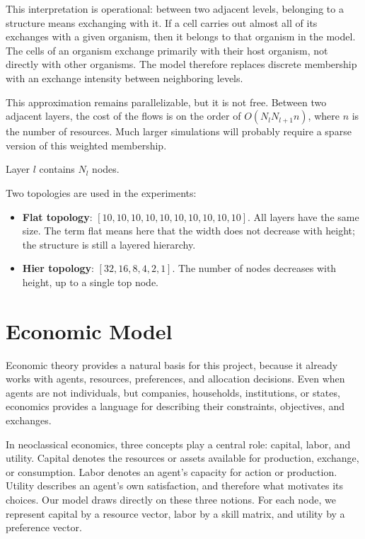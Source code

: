 \documentclass[11pt]{article}
\begin{document}
This interpretation is operational: between two adjacent levels, belonging to a structure means exchanging with it. If a cell carries out almost all of its exchanges with a given organism, then it belongs to that organism in the model. The cells of an organism exchange primarily with their host organism, not directly with other organisms. The model therefore replaces discrete membership with an exchange intensity between neighboring levels.

This approximation remains parallelizable, but it is not free. Between two adjacent layers, the cost of the flows is on the order of $O(N_l N_{l+1} n)$, where $n$ is the number of resources. Much larger simulations will probably require a sparse version of this weighted membership.

Layer $l$ contains $N_l$ nodes.

Two topologies are used in the experiments:
\begin{itemize}
    \item \textbf{Flat topology}: $[10,10,10,10,10,10,10,10,10,10]$. All layers have the same size. The term flat means here that the width does not decrease with height; the structure is still a layered hierarchy.
    \item \textbf{Hier topology}: $[32,16,8,4,2,1]$. The number of nodes decreases with height, up to a single top node.
\end{itemize}

\section{Economic Model}

Economic theory provides a natural basis for this project, because it already works with agents, resources, preferences, and allocation decisions. Even when agents are not individuals, but companies, households, institutions, or states, economics provides a language for describing their constraints, objectives, and exchanges.

In neoclassical economics, three concepts play a central role: capital, labor, and utility. Capital denotes the resources or assets available for production, exchange, or consumption. Labor denotes an agent's capacity for action or production. Utility describes an agent's own satisfaction, and therefore what motivates its choices. Our model draws directly on these three notions. For each node, we represent capital by a resource vector, labor by a skill matrix, and utility by a preference vector.
\end{document}
